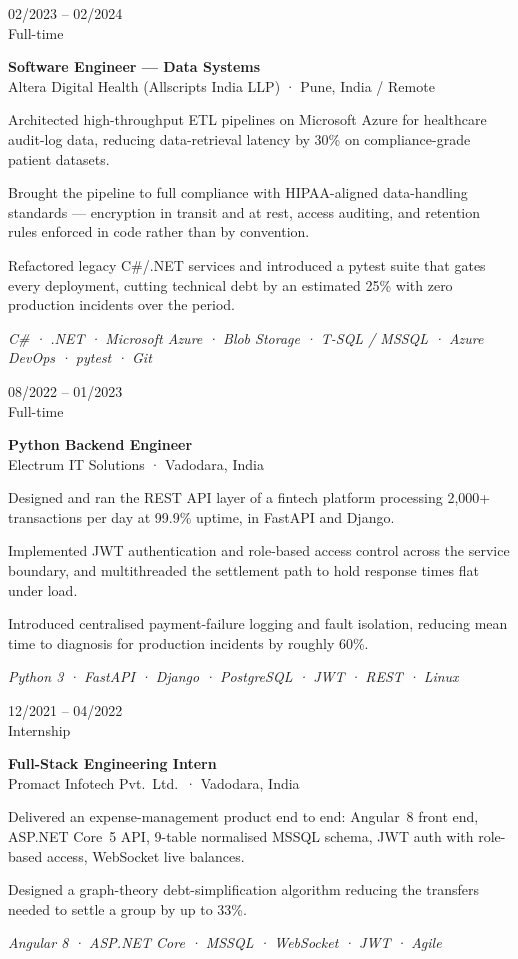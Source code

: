 \documentclass[10pt,a4paper]{article}
\newlength{\cvleft}\setlength{\cvleft}{30mm}
\newlength{\cvgap}\setlength{\cvgap}{5mm}
\newcommand{\cvrow}[2]{%
  \noindent\begin{minipage}[t]{\cvleft}\raggedright\strut #1\end{minipage}%
  \hspace{\cvgap}%
  \begin{minipage}[t]{\dimexpr\textwidth-\cvleft-\cvgap\relax}\strut #2\end{minipage}%
  \par\vspace{4.5pt}}
\newcommand{\dates}[1]{\sansfont\fontsize{9}{11}\selectfont\color{mid}#1}
\newcommand{\role}[1]{\textbf{#1}}
\newcommand{\org}[1]{{\color{mid}\fontsize{9.5}{12}\selectfont #1}}
\newcommand{\stack}[1]{{\fontsize{9}{11}\selectfont\color{mid}\textit{#1}}}
\begin{document}
\cvrow{\dates{02/2023 – 02/2024 \\ Full-time}}{%
\role{Software Engineer — Data Systems}\\
\org{Altera Digital Health (Allscripts India LLP) · Pune, India / Remote}
\begin{pts}
\item Architected high-throughput ETL pipelines on Microsoft Azure for healthcare audit-log data, reducing data-retrieval latency by 30\% on compliance-grade patient datasets.
\item Brought the pipeline to full compliance with HIPAA-aligned data-handling standards — encryption in transit and at rest, access auditing, and retention rules enforced in code rather than by convention.
\item Refactored legacy C\#/.NET services and introduced a pytest suite that gates every deployment, cutting technical debt by an estimated 25\% with zero production incidents over the period.
\end{pts}
\stack{C\# · .NET · Microsoft Azure · Blob Storage · T-SQL / MSSQL · Azure DevOps · pytest · Git}}


\cvrow{\dates{08/2022 – 01/2023 \\ Full-time}}{%
\role{Python Backend Engineer}\\
\org{Electrum IT Solutions · Vadodara, India}
\begin{pts}
\item Designed and ran the REST API layer of a fintech platform processing 2{,}000+ transactions per day at 99.9\% uptime, in FastAPI and Django.
\item Implemented JWT authentication and role-based access control across the service boundary, and multithreaded the settlement path to hold response times flat under load.
\item Introduced centralised payment-failure logging and fault isolation, reducing mean time to diagnosis for production incidents by roughly 60\%.
\end{pts}
\stack{Python 3 · FastAPI · Django · PostgreSQL · JWT · REST · Linux}}


\cvrow{\dates{12/2021 – 04/2022 \\ Internship}}{%
\role{Full-Stack Engineering Intern}\\
\org{Promact Infotech Pvt.\ Ltd.\ · Vadodara, India}
\begin{pts}
\item Delivered an expense-management product end to end: Angular~8 front end, ASP.NET Core~5 API, 9-table normalised MSSQL schema, JWT auth with role-based access, WebSocket live balances.
\item Designed a graph-theory debt-simplification algorithm reducing the transfers needed to settle a group by up to 33\%.
\end{pts}
\stack{Angular 8 · ASP.NET Core · MSSQL · WebSocket · JWT · Agile}


\newpage}
\end{document}
